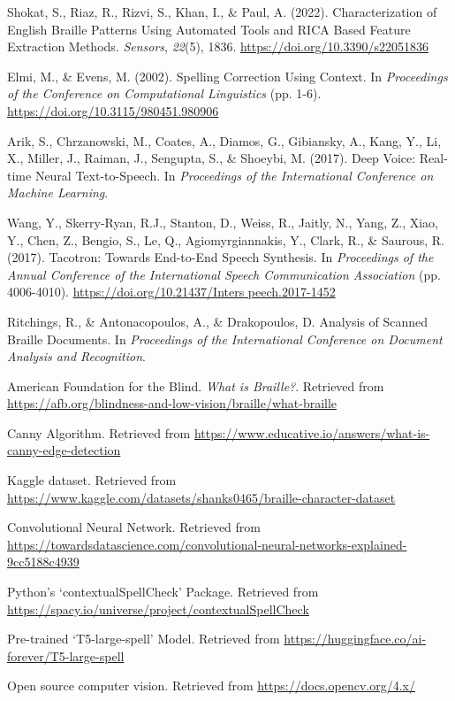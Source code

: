\begin{thebibliography}{99}
    Shokat, S., Riaz, R., Rizvi, S., Khan, I., \& Paul, A. (2022). 
    Characterization of English Braille Patterns Using Automated Tools and RICA Based Feature Extraction Methods. 
    \textit{Sensors}, \textit{22}(5), 1836. \url{https://doi.org/10.3390/s22051836}

    Elmi, M., \& Evens, M. (2002). 
    Spelling Correction Using Context. 
    In \textit{Proceedings of the Conference on Computational Linguistics} (pp. 1-6). \url{https://doi.org/10.3115/980451.980906}

    Arik, S., Chrzanowski, M., Coates, A., Diamos, G., Gibiansky, A., Kang, Y., Li, X., Miller, J., Raiman, J., Sengupta, S., \& Shoeybi, M. (2017). 
    Deep Voice: Real-time Neural Text-to-Speech. 
    In \textit{Proceedings of the International Conference on Machine Learning}.

    Wang, Y., Skerry-Ryan, R.J., Stanton, D., Weiss, R., Jaitly, N., Yang, Z., Xiao, Y., Chen, Z., Bengio, S., Le, Q., Agiomyrgiannakis, Y., Clark, R., \& Saurous, R. (2017).     Tacotron: Towards End-to-End Speech Synthesis.      In \textit{Proceedings of the Annual Conference of the International Speech Communication Association} (pp. 4006-4010). \url{https://doi.org/10.21437/Inters    peech.2017-1452}

    Ritchings, R., \& Antonacopoulos, A., \& Drakopoulos, D. 
    Analysis of Scanned Braille Documents. 
    In \textit{Proceedings of the International Conference on Document Analysis and Recognition}.

    American Foundation for the Blind. 
    \textit{What is Braille?}. Retrieved from \url{https://afb.org/blindness-and-low-vision/braille/what-braille}

    Canny Algorithm. 
    Retrieved from \url{https://www.educative.io/answers/what-is-canny-edge-detection}
    
    Kaggle dataset. 
    Retrieved from \url{https://www.kaggle.com/datasets/shanks0465/braille-character-dataset}

    Convolutional Neural Network. 
    Retrieved from \url{https://towardsdatascience.com/convolutional-neural-networks-explained-9cc5188c4939}

    Python’s ‘contextualSpellCheck’ Package. 
    Retrieved from \url{https://spacy.io/universe/project/contextualSpellCheck}

    Pre-trained ‘T5-large-spell’ Model. 
    Retrieved from \url{https://huggingface.co/ai-forever/T5-large-spell}

    Open source computer vision. 
    Retrieved from \url{https://docs.opencv.org/4.x/}
    
\end{thebibliography}

\noindent

